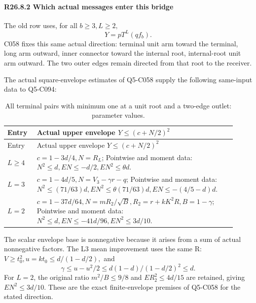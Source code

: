 \paragraph{R26.8.2 Which actual messages enter this bridge}

The old row uses, for all \(b\ge 3,\allowbreak  L\ge 2,\allowbreak \)
\[
Y=pT^L(qf_b).
\]
C058 fixes this same actual direction: terminal unit arm
toward the terminal, long arm outward, inner connector toward the
internal root, internal-root unit arm outward. The two outer edges
remain directed from that root to the receiver.

The actual square-envelope estimates of Q5-C058 supply the following same-input data to Q5-C094:


\begingroup\small
\setlength{\tabcolsep}{3pt}
\setlength{\LTleft}{0pt}\setlength{\LTright}{\fill}
\begin{longtable}{@{}p{0.1200\linewidth}p{0.8000\linewidth}@{}}
\caption{All terminal pairs with minimum one at a unit root and a two-edge outlet: parameter values.}\label{tab:parameters:r2-c026:2}\\
\toprule
Entry & Actual upper envelope \(Y\le (c+N/2)^2\) \\
\midrule\endfirsthead
\toprule
Entry & Actual upper envelope \(Y\le (c+N/2)^2\) \\
\midrule\endhead
\bottomrule\endfoot
\(L\ge 4\) & \(c=1-3d/4,\allowbreak  N=R_L\); Pointwise and moment data: \(N^2\le d,\allowbreak  EN\le -d/2,\allowbreak  EN^2\le \theta d\). \\
\addlinespace[2pt]
\(L=3\) & \(c=1-4d/5,\allowbreak  N=V_3-\gamma r-q\); Pointwise and moment data: \(N^2\le (71/63)d,\allowbreak  EN^2\le \theta(71/63)d,\allowbreak  EN\le -(4/5-d)d\). \\
\addlinespace[2pt]
\(L=2\) & \(c=1-37d/64,\allowbreak  N=mR_2/\sqrt{B},\allowbreak  R_2=r+kK^2R,\allowbreak  B=1-\gamma\); Pointwise and moment data: \(N^2\le d,\allowbreak  EN\le -41d/96,\allowbreak  EN^2\le 3d/10\). \\
\end{longtable}
\endgroup


The scalar envelope base is nonnegative because it arises from a sum of
actual nonnegative factors. The L3 mean improvement uses the same R:
\(V\ge t_0^2,\allowbreak  u=kt_0\le d/(1-d/2),\allowbreak \) and
\[
\gamma\le u-u^2/2
\le d(1-d)/(1-d/2)^2\le d.
\]
For $L=2$, the original ratio $m^2/B\le9/8$ and $ER_2^2\le4d/15$ are retained, giving $EN^2\le3d/10$. These are the exact finite-envelope premises of Q5-C058 for the stated direction.

